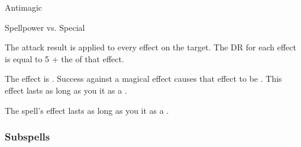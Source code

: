\newpage
\begin{spellsection}{Antimagic}

\begin{spellcontent}

\begin{spelltargetinginfo}




\end{spelltargetinginfo}


\begin{spelleffects}




\begin{spellattack}{Spellpower vs. Special}


\spellspecial
The attack result is applied to every  effect on the target.
The DR for each effect is equal to 5 + the  of that effect.



\spellsuccess
The effect is .
Success against a magical effect causes that effect to be .
This effect lasts as long as you  it as a .



\end{spellattack}





\end{spelleffects}

\end{spellcontent}
\begin{spellfooter}


\end{spellfooter}
\begin{spellsubcontent}


\begin{spellcantrip}
The spell's effect lasts as long as you  it as a .
\end{spellcantrip}


\end{spellsubcontent}
\end{spellsection}


\subsubsection{Subspells}


